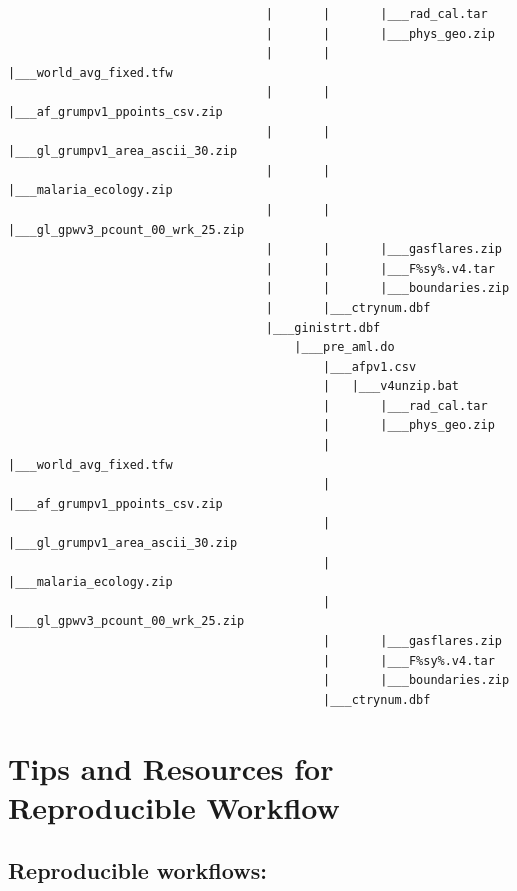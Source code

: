 \documentclass[]{book}
\begin{document}
\begin{verbatim}
                                    |       |       |___rad_cal.tar
                                    |       |       |___phys_geo.zip
                                    |       |       |___world_avg_fixed.tfw
                                    |       |       |___af_grumpv1_ppoints_csv.zip
                                    |       |       |___gl_grumpv1_area_ascii_30.zip
                                    |       |       |___malaria_ecology.zip
                                    |       |       |___gl_gpwv3_pcount_00_wrk_25.zip
                                    |       |       |___gasflares.zip
                                    |       |       |___F%sy%.v4.tar
                                    |       |       |___boundaries.zip
                                    |       |___ctrynum.dbf
                                    |___ginistrt.dbf
                                        |___pre_aml.do
                                            |___afpv1.csv
                                            |   |___v4unzip.bat
                                            |       |___rad_cal.tar
                                            |       |___phys_geo.zip
                                            |       |___world_avg_fixed.tfw
                                            |       |___af_grumpv1_ppoints_csv.zip
                                            |       |___gl_grumpv1_area_ascii_30.zip
                                            |       |___malaria_ecology.zip
                                            |       |___gl_gpwv3_pcount_00_wrk_25.zip
                                            |       |___gasflares.zip
                                            |       |___F%sy%.v4.tar
                                            |       |___boundaries.zip
                                            |___ctrynum.dbf
\end{verbatim}

\hypertarget{tips-and-resources-for-reproducible-workflow}{%
\chapter{Tips and Resources for Reproducible Workflow}\label{tips-and-resources-for-reproducible-workflow}}

\hypertarget{reproducible-workflows}{%
\section{Reproducible workflows:}\label{reproducible-workflows}}
\end{document}

